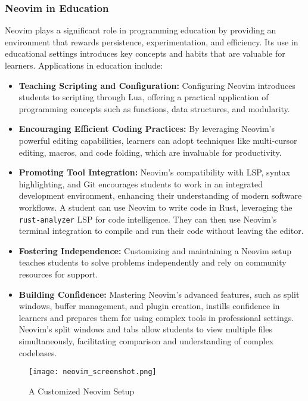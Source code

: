 \documentclass[12pt]{article}
\begin{document}
\subsubsection{Neovim in Education}

Neovim plays a significant role in programming education by providing an environment that rewards persistence, experimentation, and efficiency. Its use in educational settings introduces key concepts and habits that are valuable for learners. Applications in education include:

\begin{itemize}
    \item \textbf{Teaching Scripting and Configuration:} Configuring Neovim introduces students to scripting through Lua, offering a practical application of programming concepts such as functions, data structures, and modularity.
    \item \textbf{Encouraging Efficient Coding Practices:} By leveraging Neovim’s powerful editing capabilities, learners can adopt techniques like multi-cursor editing, macros, and code folding, which are invaluable for productivity.
    \item \textbf{Promoting Tool Integration:} Neovim’s compatibility with LSP, syntax highlighting, and Git encourages students to work in an integrated development environment, enhancing their understanding of modern software workflows. A student can use Neovim to write code in Rust, leveraging the \texttt{rust-analyzer} LSP for code intelligence. They can then use Neovim's terminal integration to compile and run their code without leaving the editor.
    \item \textbf{Fostering Independence:} Customizing and maintaining a Neovim setup teaches students to solve problems independently and rely on community resources for support.
    \item \textbf{Building Confidence:} Mastering Neovim’s advanced features, such as split windows, buffer management, and plugin creation, instills confidence in learners and prepares them for using complex tools in professional settings. Neovim's split windows and tabs allow students to view multiple files simultaneously, facilitating comparison and understanding of complex codebases.
\end{itemize}

\begin{figure}[h] %
    \centering
    \texttt{[image: neovim\_screenshot.png]}
    \caption{A Customized Neovim Setup}
\end{figure}
\end{document}
